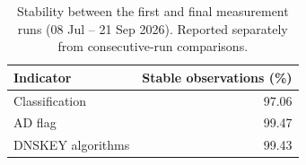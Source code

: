 \begin{table}[H]
    \centering
    \small
    \caption{Stability between the first and final measurement runs (08 Jul – 21 Sep 2026). Reported separately from consecutive-run comparisons.}
    \label{tab:run-stability-first-last}
    \begin{tabular}{@{}lr@{}}
        \toprule
        Indicator & Stable observations (\%) \\
        \midrule
        Classification & 97.06 \\
        AD flag & 99.47 \\
        DNSKEY algorithms & 99.43 \\
        \bottomrule
    \end{tabular}
\end{table}
